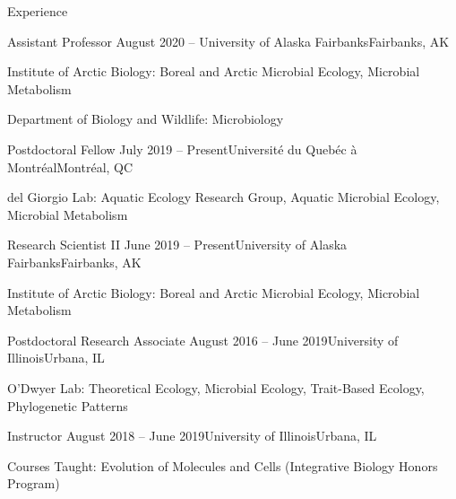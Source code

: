 \documentclass{resume} %
\begin{document}
\begin{rSection}{Experience}

    \begin{rSubsection}{Assistant Professor}
      {August 2020 -- }{University of Alaska Fairbanks}{Fairbanks, AK}
      \item Institute of Arctic Biology: Boreal and Arctic Microbial Ecology, Microbial Metabolism
      \item Department of Biology and Wildlife: Microbiology
    \end{rSubsection}  

    \begin{rSubsection}{Postdoctoral Fellow}
      {July 2019 -- Present}{Universit\'{e} du Queb\'{e}c \`{a} Montr\'{e}al}{Montr\'{e}al, QC}
      \item del Giorgio Lab: Aquatic Ecology Research Group, Aquatic Microbial Ecology, Microbial Metabolism
    \end{rSubsection}
    
    \begin{rSubsection}{Research Scientist II}
      {June 2019 -- Present}{University of Alaska Fairbanks}{Fairbanks, AK}
      \item Institute of Arctic Biology: Boreal and Arctic Microbial Ecology, Microbial Metabolism
    \end{rSubsection}  
  
    \begin{rSubsection}{Postdoctoral Research Associate}
      {August 2016 -- June 2019}{University of Illinois}{Urbana, IL}
      \item O'Dwyer Lab: Theoretical Ecology, Microbial Ecology, Trait-Based Ecology, Phylogenetic Patterns
    \end{rSubsection}

    \begin{rSubsection}{Instructor}
      {August 2018 -- June 2019}{University of Illinois}{Urbana, IL}
      \item Courses Taught: Evolution of Molecules and Cells (Integrative Biology Honors Program)
    \end{rSubsection}


\end{rSection}
\end{document}
